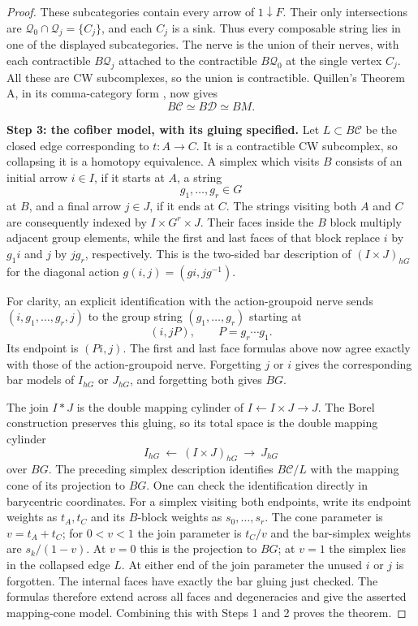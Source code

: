 \begin{proof}
These subcategories contain every arrow of $1\mathbin{\downarrow}F$.
Their only intersections are
$\mathcal Q_0\cap\mathcal Q_j=\{C_j\}$, and each $C_j$ is a sink.
Thus every composable string lies in one of the displayed subcategories.
The nerve is the union of their nerves, with each contractible
$B\mathcal Q_j$ attached to the contractible $B\mathcal Q_0$ at the
single vertex $C_j$. All these are CW subcomplexes, so the union is
contractible. Quillen's Theorem A, in its comma-category form
\cite[Theorem A]{quillen1973}, now gives
\[
 B\mathcal C\simeq B\mathcal D\simeq BM.
\]

\textbf{Step 3: the cofiber model, with its gluing specified.}
Let $L\subset B\mathcal C$ be the closed edge corresponding to $t:A\to C$.
It is a contractible CW subcomplex, so collapsing it is a homotopy
equivalence. A simplex which visits $B$ consists of an initial arrow
$i\in I$, if it starts at $A$, a string
\[
 g_1,\ldots,g_r\in G
\]
at $B$, and a final arrow $j\in J$, if it ends at $C$.
The strings visiting both $A$ and $C$ are consequently indexed by
$I\times G^r\times J$. Their faces inside the $B$ block multiply adjacent
group elements, while the first and last faces of that block replace
$i$ by $g_1i$ and $j$ by $jg_r$, respectively. This is the two-sided bar
description of $(I\times J)_{hG}$ for the diagonal action
$g(i,j)=(gi,jg^{-1})$.

For clarity, an explicit identification with the action-groupoid nerve
sends $(i,g_1,\ldots,g_r,j)$ to the group string
$(g_1,\ldots,g_r)$ starting at
\[
 (i,jP),\qquad P=g_r\cdots g_1.
\]
Its endpoint is $(Pi,j)$. The first and last face formulas above now agree
exactly with those of the action-groupoid nerve. Forgetting $j$ or $i$
gives the corresponding bar models of $I_{hG}$ or $J_{hG}$, and forgetting
both gives $BG$.

The join $I*J$ is the double mapping cylinder of
$I\leftarrow I\times J\to J$. The Borel construction preserves this
gluing, so its total space is the double mapping cylinder
\[
 I_{hG}\ \longleftarrow\ (I\times J)_{hG}\
 \longrightarrow\ J_{hG}
\]
over $BG$. The preceding simplex description identifies
$B\mathcal C/L$ with the mapping cone of its projection to $BG$.
One can check the identification directly in barycentric coordinates.
For a simplex visiting both endpoints, write its endpoint weights as
$t_A,t_C$ and its $B$-block weights as $s_0,\ldots,s_r$.
The cone parameter is $v=t_A+t_C$; for $0<v<1$ the join parameter is
$t_C/v$ and the bar-simplex weights are $s_k/(1-v)$.
At $v=0$ this is the projection to $BG$; at $v=1$ the simplex lies in
the collapsed edge $L$. At either end of the join parameter the unused
$i$ or $j$ is forgotten. The internal faces have exactly the bar gluing
just checked. The formulas therefore extend across all faces and
degeneracies and give the asserted mapping-cone model. Combining this
with Steps 1 and 2 proves the theorem.
\end{proof}

